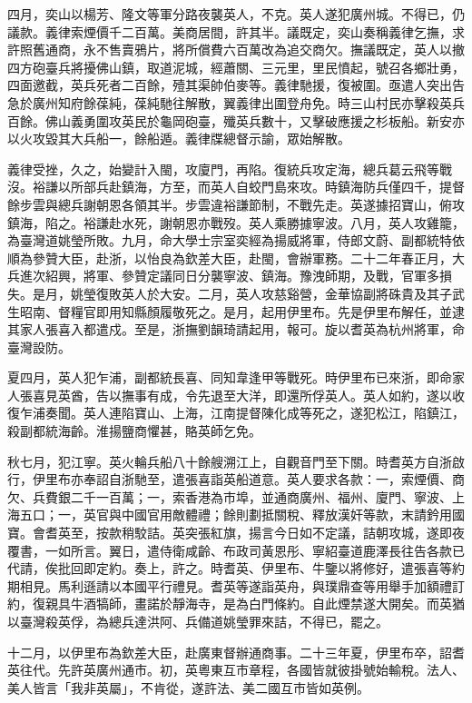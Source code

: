 \begin{pinyinscope}
四月，奕山以楊芳、隆文等軍分路夜襲英人，不克。英人遂犯廣州城。不得已，仍議款。義律索煙價千二百萬。美商居間，許其半。議既定，奕山奏稱義律乞撫，求許照舊通商，永不售賣鴉片，將所償費六百萬改為追交商欠。撫議既定，英人以撤四方砲臺兵將擾佛山鎮，取道泥城，經蕭關、三元里，里民憤起，號召各鄉壯勇，四面邀截，英兵死者二百餘，殪其渠帥伯麥等。義律馳援，復被圍。亟遣人突出告急於廣州知府餘葆純，葆純馳往解散，翼義律出圍登舟免。時三山村民亦擊殺英兵百餘。佛山義勇圍攻英民於龜岡砲臺，殲英兵數十，又擊破應援之杉板船。新安亦以火攻毀其大兵船一，餘船遁。義律牒總督示諭，眾始解散。

義律受挫，久之，始變計入閩，攻廈門，再陷。復統兵攻定海，總兵葛云飛等戰沒。裕謙以所部兵赴鎮海，方至，而英人自蛟門島來攻。時鎮海防兵僅四千，提督餘步雲與總兵謝朝恩各領其半。步雲違裕謙節制，不戰先走。英遂據招寶山，俯攻鎮海，陷之。裕謙赴水死，謝朝恩亦戰歿。英人乘勝據寧波。八月，英人攻雞籠，為臺灣道姚瑩所敗。九月，命大學士宗室奕經為揚威將軍，侍郎文蔚、副都統特依順為參贊大臣，赴浙，以怡良為欽差大臣，赴閩，會辦軍務。二十二年春正月，大兵進次紹興，將軍、參贊定議同日分襲寧波、鎮海。豫洩師期，及戰，官軍多損失。是月，姚瑩復敗英人於大安。二月，英人攻慈谿營，金華協副將硃貴及其子武生昭南、督糧官即用知縣顏履敬死之。是月，起用伊里布。先是伊里布解任，並逮其家人張喜入都遣戍。至是，浙撫劉韻琦請起用，報可。旋以耆英為杭州將軍，命臺灣設防。

夏四月，英人犯乍浦，副都統長喜、同知韋逢甲等戰死。時伊里布已來浙，即命家人張喜見英酋，告以撫事有成，令先退至大洋，即還所俘英人。英人如約，遂以收復乍浦奏聞。英人連陷寶山、上海，江南提督陳化成等死之，遂犯松江，陷鎮江，殺副都統海齡。淮揚鹽商懼甚，賂英師乞免。

秋七月，犯江寧。英火輪兵船八十餘艘溯江上，自觀音門至下關。時耆英方自浙啟行，伊里布亦奉詔自浙馳至，遣張喜詣英船道意。英人要求各款：一，索煙價、商欠、兵費銀二千一百萬；一，索香港為市埠，並通商廣州、福州、廈門、寧波、上海五口；一，英官與中國官用敵體禮；餘則劃抵關稅、釋放漢奸等款，末請鈐用國寶。會耆英至，按款稍駮詰。英突張紅旗，揚言今日如不定議，詰朝攻城，遂即夜覆書，一如所言。翼日，遣侍衛咸齡、布政司黃恩彤、寧紹臺道鹿澤長往告各款已代請，俟批回即定約。奏上，許之。時耆英、伊里布、牛鑒以將修好，遣張喜等約期相見。馬利遜請以本國平行禮見。耆英等遂詣英舟，與璞鼎查等用舉手加額禮訂約，復親具牛酒犒師，畫諾於靜海寺，是為白門條約。自此煙禁遂大開矣。而英猶以臺灣殺英俘，為總兵達洪阿、兵備道姚瑩罪來詰，不得已，罷之。

十二月，以伊里布為欽差大臣，赴廣東督辦通商事。二十三年夏，伊里布卒，詔耆英往代。先許英廣州通市。初，英粵東互市章程，各國皆就彼掛號始輸稅。法人、美人皆言「我非英屬」，不肯從，遂許法、美二國互市皆如英例。


\end{pinyinscope}
